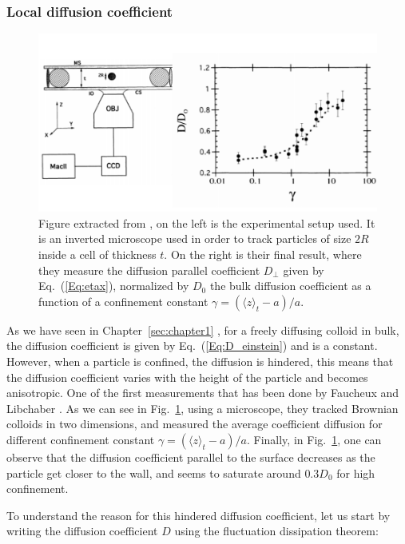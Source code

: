 \subsubsection{Local diffusion coefficient}

\begin{figure}
	\centering
	\includegraphics{02_body/chapter1/image/libchaber.pdf}
	\caption{Figure extracted from \cite{faucheux_confined_1994}, on the left is the experimental setup used. It is an inverted microscope used in order to track particles of size $2R$ inside a cell of thickness $t$. On the right is their final result, where they measure the diffusion parallel coefficient $D_\bot$ given by Eq.~(\ref{Eq:etax}), normalized by $D_0$ the bulk diffusion coefficient as a function of a confinement constant $\gamma = (\langle z \rangle_t -a)/a$. }
	\label{fig:libchaber}
\end{figure}


As we have seen in Chapter~\ref{sec:chapter1} , for a freely diffusing colloid in bulk, the diffusion coefficient is given by Eq.~(\ref{Eq:D_einstein}) and is a constant. However, when a particle is confined, the diffusion is hindered, this means that the diffusion coefficient varies with the height of the particle and becomes anisotropic. One of the first measurements that has been done by Faucheux and Libchaber \cite{faucheux_confined_1994}. As we can see in Fig.~\ref{fig:libchaber}, using a microscope, they tracked Brownian colloids in two dimensions, and measured the average coefficient diffusion for different confinement constant $\gamma = (\langle z\rangle_t - a) / a$. Finally, in Fig.~\ref{fig:libchaber}, one can observe that the diffusion coefficient parallel to the surface decreases as the particle get closer to the wall, and seems to saturate around $0.3D_0$ for high confinement. 
\newpage

To understand the reason for this hindered diffusion coefficient, let us start by writing the diffusion coefficient $D$ using the fluctuation dissipation theorem:

